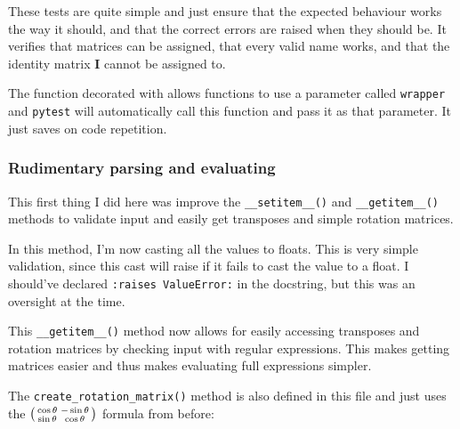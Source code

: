 \documentclass[../main.tex]{subfiles}
\begin{document}

These tests are quite simple and just ensure that the expected behaviour works the way it should, and that the correct errors are raised when they should be. It verifies that matrices can be assigned, that every valid name works, and that the identity matrix \textbf{I} cannot be assigned to.

The function decorated with  allows functions to use a parameter called \texttt{wrapper} and \texttt{pytest} will automatically call this function and pass it as that parameter. It just saves on code repetition.

\subsubsection{Rudimentary parsing and evaluating\label{development:matrices-backend:rudimentary-parsing-and-evaluating}}

This first thing I did here was improve the \texttt{\_\_setitem\_\_()} and \texttt{\_\_getitem\_\_()} methods to validate input and easily get transposes and simple rotation matrices.


In this method, I'm now casting all the values to floats. This is very simple validation, since this cast will raise  if it fails to cast the value to a float. I should've declared \texttt{:raises ValueError:} in the docstring, but this was an oversight at the time.


This \texttt{\_\_getitem\_\_()} method now allows for easily accessing transposes and rotation matrices by checking input with regular expressions. This makes getting matrices easier and thus makes evaluating full expressions simpler.

The \texttt{create\_rotation\_matrix()} method is also defined in this file and just uses the $\begin{psmallmatrix}\cos\theta & -\sin\theta\\\sin\theta & \cos\theta\end{psmallmatrix}$ formula from before:

\end{document}
